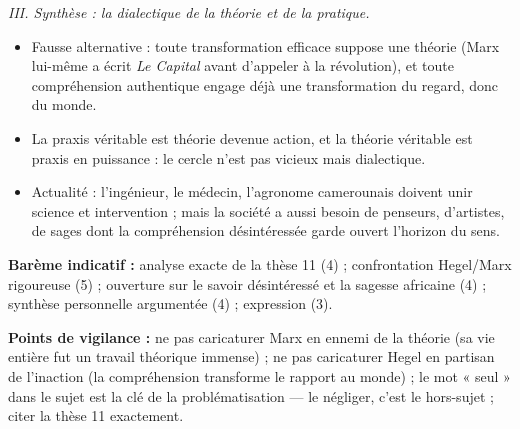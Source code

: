 \documentclass[11pt]{article}
\begin{document}
\begin{corrige}
\emph{III. Synthèse : la dialectique de la théorie et de la pratique.}
\begin{itemize}
\item Fausse alternative : toute transformation efficace suppose une théorie (Marx lui-même a écrit \emph{Le Capital} avant d'appeler à la révolution), et toute compréhension authentique engage déjà une transformation du regard, donc du monde.
\item La praxis véritable est théorie devenue action, et la théorie véritable est praxis en puissance : le cercle n'est pas vicieux mais dialectique.
\item Actualité : l'ingénieur, le médecin, l'agronome camerounais doivent unir science et intervention ; mais la société a aussi besoin de penseurs, d'artistes, de sages dont la compréhension désintéressée garde ouvert l'horizon du sens.
\end{itemize}

\textbf{Barème indicatif :} analyse exacte de la thèse 11 (4) ; confrontation Hegel/Marx rigoureuse (5) ; ouverture sur le savoir désintéressé et la sagesse africaine (4) ; synthèse personnelle argumentée (4) ; expression (3).

\textbf{Points de vigilance :} ne pas caricaturer Marx en ennemi de la théorie (sa vie entière fut un travail théorique immense) ; ne pas caricaturer Hegel en partisan de l'inaction (la compréhension transforme le rapport au monde) ; le mot « seul » dans le sujet est la clé de la problématisation — le négliger, c'est le hors-sujet ; citer la thèse 11 exactement.
\end{corrige}
\end{document}
